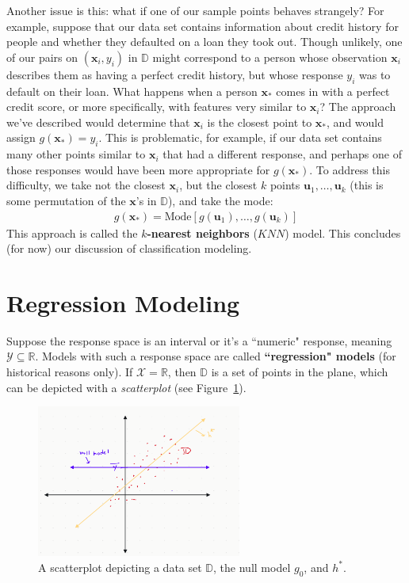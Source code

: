 \documentclass[12pt, a4paper]{article}
\theoremstyle{definition}
\begin{document}
	Another issue is this: what if one of our sample points behaves strangely? For example, suppose
	that our data set contains information about credit history for people and whether they
	defaulted on a loan they took out. Though unlikely, one of our pairs on $(\mathbf{x}_i, y_i)$
	in $\mathbb{D}$ might correspond to a person whose observation $\mathbf{x}_i$ describes them as having
	a perfect credit history, but whose response $y_i$ was to default on their loan. What happens
	when a person $\mathbf{x}_*$ comes in with a perfect credit score, or more specifically,
	with features very similar to $\mathbf{x}_i$?  The approach we've described
	would determine that $\mathbf{x}_i$ is the closest point to $\mathbf{x}_*$, and would assign $g(\mathbf{x}_*)=y_i$. This is problematic, for example, if our data set contains many
	other points similar to $\mathbf{x}_i$ that had a different response, and perhaps one of those
	responses would have been more appropriate for $g(\mathbf{x}_*)$. To address this difficulty,
	we take not the closest $\mathbf{x}_i$, but the closest $k$ points $\mathbf{u}_1,\ldots,\mathbf{u}_k$
	(this is some permutation of the $\mathbf{x}$'s in $\mathbb{D}$), and take the mode:
	\begin{align*}
		g(\mathbf{x}_*)=\text{Mode}[g(\mathbf{u}_1),\ldots,g(\mathbf{u}_k)]
	\end{align*}
	This approach is called the \textbf{$k$-nearest neighbors} ($KNN$) model.
	This concludes (for now) our discussion of classification modeling.
	\section*{Regression Modeling}
	Suppose the response space is an interval or it's a ``numeric" response, meaning
	$\mathcal{Y}\subseteq \mathbb{R}$. Models with such a response space are called
	\textbf{``regression" models} (for historical reasons only). If $\mathcal{X}=\mathbb{R}$,
	then $\mathbb{D}$ is a set of points in the plane, which can be depicted with a
	\emph{scatterplot} (see Figure~\ref{fig:scatter-plot}).
	\begin{figure}
		\centering
		\includegraphics[width=0.6\textwidth]{scatter-plot-null-model}
		\caption{A scatterplot depicting a data set $\mathbb{D}$, the null model $g_0$,
		and $h^*$.}
		\label{fig:scatter-plot}
	\end{figure}
	
\end{document}
